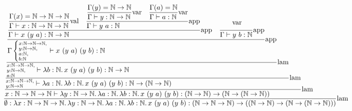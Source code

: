 \documentclass{article}
\newcommand{\st}[3][]{\ensuremath \displaystyle\frac{#3\hfill}{#2\hfill} \text{#1}}
\newcommand{\N}{\ensuremath \mathbb N}
\begin{document}
\begin{landscape}
    \begin{align*}
        \st[lam]{
            \emptyset: \lam{x:\N\to \N\to \N}{\lam{y:\N\to \N}{\lam{a:\N}{\lam{b:\N}{x\ (y\ a)\ (y\ b)}}}}:(\N\to\N\to\N)\to((\N\to\N)\to(\N\to(\N\to\N)))
        }{
            \st[lam]{
                x:\N\to\N\to\N\vdash \lam{y:\N\to \N}{\lam{a:\N}{\lam{b:\N}{x\ (y\ a)\ (y\ b)}}} : (\N\to\N)\to(\N\to(\N\to\N))
            }{
                \st[lam]{
                    \substack{x:\N\to\N\to\N,\hfill\\y:\N\to\N\hfill}\vdash \lam{a:\N}{\lam{b:\N}{x\ (y\ a)\ (y\ b)}}:\N\to(\N\to\N)
                }{
                    \st[lam] {
                        \substack{x:\N\to\N\to\N,\hfill\\y:\N\to\N,\hfill\\a:\N\hfill}\vdash \lam{b:\N}{x\ (y\ a)\ (y\ b)}:\N\to\N
                    }{
                        \st[app] {
                            \Gamma \left\{\substack{x:\N\to\N\to\N,\hfill\\y:\N\to\N,\hfill\\a:\N,\hfill\\b:\N\hfill}\right.\vdash x\ (y\ a)\ (y\ b):\N
                        }{
                            \st[app]{
                                \Gamma\vdash x\ (y\ a): \N\to\N
                            }{
                                \st[val]{
                                    \Gamma\vdash x:\N\to\N\to\N
                                }{
                                    \Gamma(x)=\N\to\N\to\N
                                }
                                \quad
                                \st[app]{
                                    \Gamma\vdash y\ a:\N
                                }{
                                    \st[var]{
                                        \Gamma\vdash y:\N\to\N
                                    }{
                                        \Gamma(y)=\N\to\N
                                    }
                                    \quad
                                    \st[var]{
                                        \Gamma\vdash a:\N
                                    }{
                                        \Gamma(a)=\N
                                    }
                                }
                            }
                            \quad
                            \st[app]{
                                \Gamma\vdash y\ b:\N
                            }{
                                \st[var]{
}}}}}}}
\end{align*}
\end{landscape}
\end{document}
